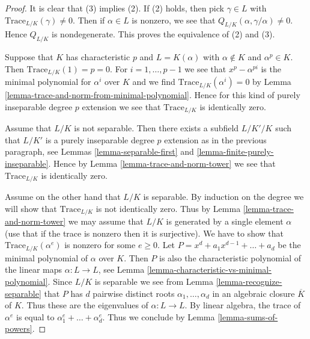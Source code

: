 \begin{proof}
It is clear that (3) implies (2). If (2) holds, then pick $\gamma \in L$
with $\text{Trace}_{L/K}(\gamma) \not = 0$. Then if $\alpha \in L$
is nonzero, we see that $Q_{L/K}(\alpha, \gamma/\alpha) \not = 0$.
Hence $Q_{L/K}$ is nondegenerate. This proves the equivalence of
(2) and (3).

\medskip\noindent
Suppose that $K$ has characteristic $p$ and $L = K(\alpha)$ with
$\alpha \not \in K$ and $\alpha^p \in K$. Then $\text{Trace}_{L/K}(1) = p = 0$.
For $i = 1, \ldots, p - 1$ we see that $x^p - \alpha^{pi}$ is the minimal
polynomial for $\alpha^i$ over $K$ and we find
$\text{Trace}_{L/K}(\alpha^i) = 0$ by
Lemma \ref{lemma-trace-and-norm-from-minimal-polynomial}.
Hence for this kind of purely inseparable degree $p$ extension
we see that $\text{Trace}_{L/K}$ is identically zero.

\medskip\noindent
Assume that $L/K$ is not separable. Then there exists a subfield
$L/K'/K$ such that $L/K'$ is a purely inseparable degree $p$ extension
as in the previous paragraph, see
Lemmas \ref{lemma-separable-first} and \ref{lemma-finite-purely-inseparable}.
Hence by Lemma \ref{lemma-trace-and-norm-tower}
we see that $\text{Trace}_{L/K}$ is identically zero.

\medskip\noindent
Assume on the other hand that $L/K$ is separable.
By induction on the degree we will show that
$\text{Trace}_{L/K}$ is not identically zero.
Thus by Lemma \ref{lemma-trace-and-norm-tower} we may assume that
$L/K$ is generated by a single element $\alpha$ (use that if
the trace is nonzero then it is surjective).
We have to show that $\text{Trace}_{L/K}(\alpha^e)$
is nonzero for some $e \geq 0$.
Let $P = x^d + a_1 x^{d - 1} + \ldots + a_d$ be the minimal
polynomial of $\alpha$ over $K$.
Then $P$ is also the characteristic polynomial of the linear
maps $\alpha : L \to L$, see
Lemma \ref{lemma-characteristic-vs-minimal-polynomial}.
Since $L/K$ is separable we see from Lemma \ref{lemma-recognize-separable}
that $P$ has $d$ pairwise distinct roots $\alpha_1, \ldots, \alpha_d$
in an algebraic closure $\overline{K}$ of $K$. Thus these are the
eigenvalues of $\alpha : L \to L$.
By linear algebra, the trace of $\alpha^e$ is
equal to $\alpha_1^e + \ldots + \alpha_d^e$.
Thus we conclude by Lemma \ref{lemma-sums-of-powers}.
\end{proof}

